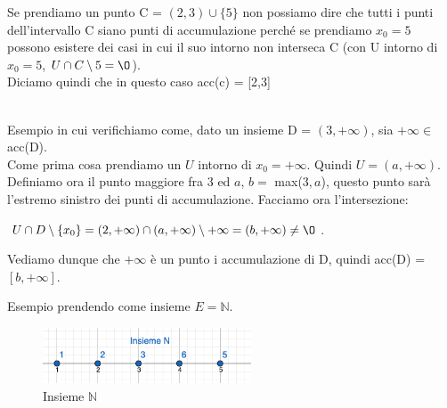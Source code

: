 Se prendiamo un punto C = $(2,3) \cup \{5\}$ non possiamo dire che tutti i punti dell'intervallo C siano punti di accumulazione perché se prendiamo $x_0 = 5$ possono esistere dei casi in cui il suo intorno non interseca C (con U intorno di $x_0 = 5$, $U \cap C \setminus {5} = \O$).\\
Diciamo quindi che in questo caso acc(c) = [2,3]\\\\
\begin{example}
    Esempio in cui verifichiamo come, dato un insieme D = $(3, +\infty)$, sia $+\infty \in$ acc(D).\\
    Come prima cosa prendiamo un $U$ intorno di $x_0 = +\infty$. Quindi $U = (a, +\infty)$.\\
    Definiamo ora il punto maggiore fra 3 ed $a$, $b =$ max($3,a$), questo punto sarà l'estremo sinistro dei punti di accumulazione.
    Facciamo ora l'intersezione:
    \begin{center}
        $U \cap D \setminus \{x_0\} = (2, +\infty) \cap (a, +\infty) \setminus {+\infty} = (b, +\infty) \neq \O$.
    \end{center}
    Vediamo dunque che $+\infty$ è un punto i accumulazione di D, quindi acc(D) = $[b, +\infty]$.
\end{example}
\newpage
\begin{example}
    Esempio prendendo come insieme $E = \mathbb{N}$.
\end{example}
\begin{figure}
    \vspace{-15pt}
    \centering
    \includegraphics[width=6.2cm]{images/insieme-N.png}
    \caption{Insieme $\mathbb{N}$}
    \label{fig:insieme-N}
\end{figure}

